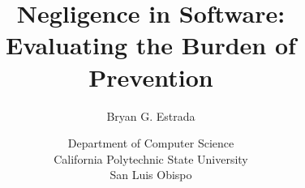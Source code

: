 \documentclass[12pt]{book}
\begin{document}

\title{Negligence in Software:\\Evaluating the Burden of Prevention}
\author{Bryan G. Estrada}
\date{Department of Computer Science\\
      California Polytechnic State University\\
      San Luis Obispo}

\begin{titlepage}
\vfill
\maketitle\thispagestyle{empty}
\vfill
\end{titlepage}

\doublespace
\tableofcontents
\newpage










\appendix
%

%




\end{document}
